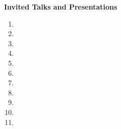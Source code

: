 \documentclass[10pt]{article}
\begin{document}
\vspace{1em} {\Large \textbf{Invited Talks and Presentations}}
\begin{enumerate}[resume]
\item {}
\item {}
\item {}
\item {}
\item {}
\item {}
\item {}
\item {}
\item {}
\item {}
\item {}
\end{enumerate}
\end{document}
